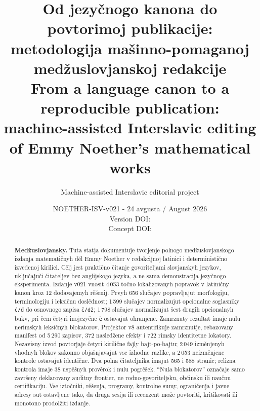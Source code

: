\documentclass[11pt]{article}
\title{\sffamily\bfseries\color{NoetherBlue}
Od jezyčnogo kanona do povtorimoj publikacije:\\
metodologija mašinno-pomaganoj medžuslovjanskoj redakcije\\[0.65em]
\large From a language canon to a reproducible publication:\\
machine-assisted Interslavic editing of Emmy Noether's mathematical works}
\author{Machine-assisted Interslavic editorial project}
\date{NOETHER-ISV-v021 - 24 avgusta / August 2026\\
Version DOI: \doiurl{10.5281/zenodo.22077468}\\
Concept DOI: \doiurl{10.5281/zenodo.21926382}}
\newcommand{\code}[1]{\texttt{#1}}
\begin{document}
\maketitle

\begin{abstract}
\noindent\textbf{Medžuslovjansky.}
Tuta statja dokumentuje tvorjenje polnogo medžuslovjanskogo izdanja matematičnyh děl Emmy Noether v redakcijnoj latinici i deterministično izvedenoj kirilici. Cělj jest praktično čitanje govoriteljami slovjanskyh jezykov, uključajuči čitateljev bez anglijskogo jezyka, a ne sama demonstracija jezyčnogo eksperimenta. Izdanje v021 vnosit 4\,053 točno lokalizovanyh popravok v latiničny kanon kroz 12 dodavajemyh rěšenij. Prvyh 656 slučajev popravljajut morfologiju, terminologiju i leksičnu doslědnost; 1\,599 slučajev normalizujut opcionalne soglasniky \code{ć/đ} do osnovnogo zapisa \code{č/dž}; 1\,798 slučajev normalizujut šest drugih opcionalnyh bukv, pri čem četyri inojezyčne \code{è} ostavajut ohranjene. Zamrznuty rezultat imaje nulu nerimskyh leksičnyh blokatorov. Projektor v8 autentifikuje zamrznutje, rebazovany manifest od 5\,290 zapisov, 372 nasledžene efekty i 722 rimsky identitetne lokatory. Nezavisny izvod povtorjaje četyri kirilične fajly bajt-po-bajtu; 2\,049 izměnjenyh vhodnyh blokov zakonno objašnjavajut vse izhodne razlike, a 2\,053 neizměnjene kontrole ostavajut identične. Dva polna čitateljnika imajut 565 i 588 stranic; relizna kontrola imaje 38 uspěšnyh prověrok i nulu pogrěšek. ``Nula blokatorov'' označaje samo završeny deklarovany auditny frontier, ne rodno-govoriteljsku, obćinsku ili naučnu certifikaciju. Vse iztočniki, rěšenja, programy, kontrolne sumy, ograničenja i javne adresy sut ostavljene tako, da druga sesija ili recenzent može povtoriti, kritikovati ili monotono prodolžiti izdanje.


\end{abstract}
\end{document}
